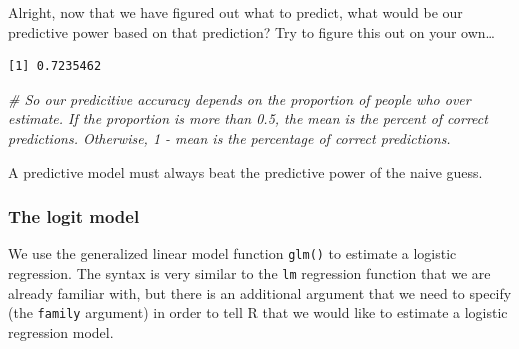\documentclass[]{article}
\newenvironment{Shaded}{\begin{snugshade}}{\end{snugshade}}
\newcommand{\CommentTok}[1]{\textcolor[rgb]{0.56,0.35,0.01}{\textit{#1}}}
\newcommand{\DataTypeTok}[1]{\textcolor[rgb]{0.13,0.29,0.53}{#1}}
\newcommand{\DecValTok}[1]{\textcolor[rgb]{0.00,0.00,0.81}{#1}}
\newcommand{\FloatTok}[1]{\textcolor[rgb]{0.00,0.00,0.81}{#1}}
\newcommand{\KeywordTok}[1]{\textcolor[rgb]{0.13,0.29,0.53}{\textbf{#1}}}
\newcommand{\NormalTok}[1]{#1}
\newcommand{\OperatorTok}[1]{\textcolor[rgb]{0.81,0.36,0.00}{\textbf{#1}}}
\newcommand{\StringTok}[1]{\textcolor[rgb]{0.31,0.60,0.02}{#1}}
\begin{document}
Alright, now that we have figured out what to predict, what would be our predictive power based on that prediction? Try to figure this out on your own\ldots{}

\begin{Shaded}
\end{Shaded}

\begin{verbatim}
[1] 0.7235462
\end{verbatim}

\begin{Shaded}
\begin{Highlighting}[]
\CommentTok{# So our predicitive accuracy depends on the proportion of people who over estimate. If the proportion is more than 0.5, the mean is the percent of correct predictions. Otherwise, 1 - mean is the percentage of correct predictions.}
\end{Highlighting}
\end{Shaded}

A predictive model must always beat the predictive power of the naive guess.

\hypertarget{the-logit-model}{%
\subsubsection{The logit model}\label{the-logit-model}}

We use the generalized linear model function \texttt{glm()} to estimate a logistic regression. The syntax is very similar to the \texttt{lm} regression function that we are already familiar with, but there is an additional argument that we need to specify (the \texttt{family} argument) in order to tell R that we would like to estimate a logistic regression model.
\end{document}
